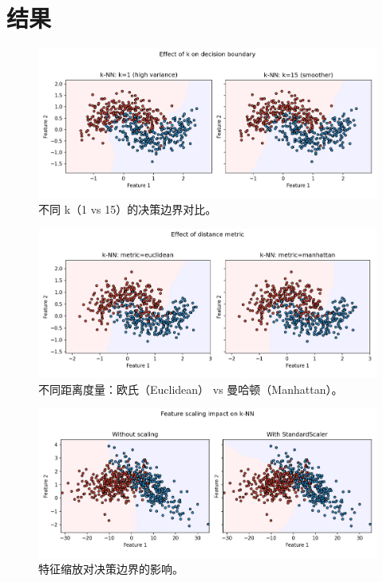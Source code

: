 \documentclass[UTF8,zihao=-4]{ctexart}
\begin{document}


\section{结果}
\begin{figure}[H]
  \centering
  \includegraphics[width=0.95\linewidth]{knn_k_compare.png}
  \caption{不同 k（1 vs 15）的决策边界对比。}
  \label{fig:knn_k_cn}
\end{figure}
\FloatBarrier

\begin{figure}[H]
  \centering
  \includegraphics[width=0.95\linewidth]{knn_metric_compare.png}
  \caption{不同距离度量：欧氏（Euclidean） vs 曼哈顿（Manhattan）。}
  \label{fig:knn_metric_cn}
\end{figure}
\FloatBarrier

\begin{figure}[H]
  \centering
  \includegraphics[width=0.95\linewidth]{knn_scaling_effect.png}
  \caption{特征缩放对决策边界的影响。}
  \label{fig:knn_scale_cn}
\end{figure}
\FloatBarrier
\end{document}
